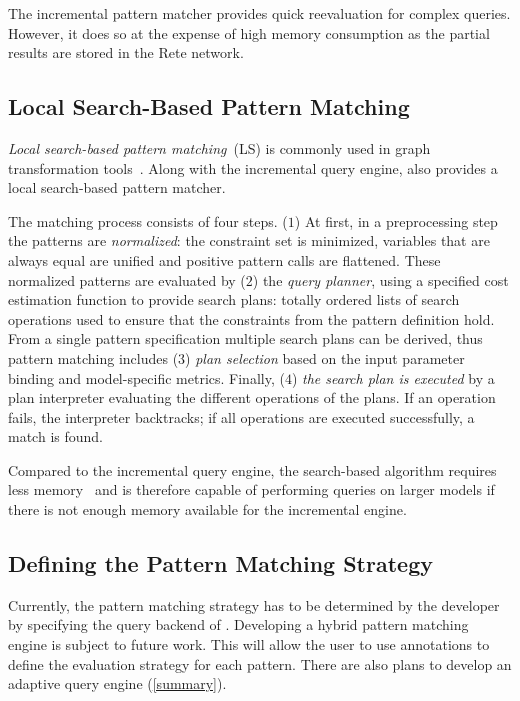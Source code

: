 \documentclass[submission,copyright,creativecommons]{eptcs}
\begin{document}
The incremental pattern matcher provides quick reevaluation for complex queries. However, it does so at the expense of high memory consumption as the partial results are stored in the Rete network.

\subsection{Local Search-Based Pattern Matching}

\emph{Local search-based pattern matching}~(LS) is commonly used in graph transformation tools~\cite{FUJABA,GrGen}. Along with the incremental query engine, \eiq also provides a local search-based pattern matcher. 

The matching process consists of four steps. ($1$) At first, in a preprocessing step the patterns are \emph{normalized}: the constraint set is minimized, variables that are always equal are unified and positive pattern calls are flattened. These normalized patterns are evaluated by ($2$) the \emph{query planner}, using a specified cost estimation function to provide search plans: %
totally ordered lists of search operations used to ensure that the constraints from the pattern definition hold. From a single pattern specification multiple search plans can be derived, thus pattern matching includes ($3$) \emph{plan selection} based on the input parameter binding and model-specific metrics. Finally, ($4$) \emph{the search plan is executed} by a plan interpreter evaluating the different operations of the plans. If an operation fails, the interpreter backtracks; if all operations are executed successfully, a match is found.

Compared to the incremental query engine, the search-based algorithm requires less memory~\cite{IST15} and is therefore capable of performing queries on larger models if there is not enough memory available for the incremental engine.

\subsection{Defining the Pattern Matching Strategy}

Currently, the pattern matching strategy has to be determined by the developer by specifying the query backend of \eiq. Developing a hybrid pattern matching engine is subject to future work. This will allow the user to use annotations to define the evaluation strategy for each pattern. There are also plans to develop an adaptive query engine (\autoref{summary}).
\end{document}
